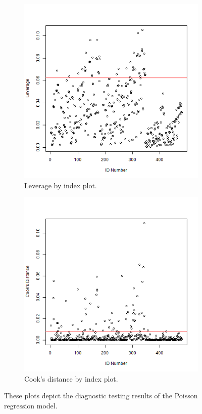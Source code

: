 \graphicspath{{./images/}}
\begin{figure}[!htbp]
    \centering
    \begin{subfigure}[t]{0.48\textwidth}
    \centering
        \includegraphics[width=\linewidth]{Leverage_for_poisson.png} 
        \caption{Leverage by index plot.} \label{fig:lev2}
    \end{subfigure}%
    \hspace{0.45cm}
    \begin{subfigure}[t]{0.48\textwidth}
    \centering
        \includegraphics[width=\linewidth]{cook_for_poisson.png} 
        \caption{Cook's distance by index plot.} \label{fig:cook2}
    \end{subfigure}%
    
\caption{These plots depict the diagnostic testing results of the Poisson regression model.}
\label{fig:fig2}
\end{figure}